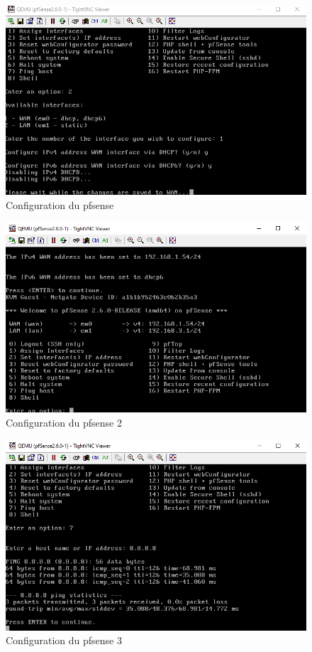 \begin{figure}[H]
 \centering
    \includegraphics[width=15cm]{Images/BRadesMelian-Topologie9.png}
    \caption{Configuration du pfsense}
    \label{Chap2.4.10}
\end{figure}    
\smallskip

\begin{figure}[H]
 \centering
    \includegraphics[width=15cm]{Images/BRadesMelian-Topologie10.png}
    \caption{Configuration du pfsense 2}
    \label{Chap2.4.11}
\end{figure}    
\smallskip

\begin{figure}[H]
 \centering
    \includegraphics[width=15cm]{Images/BRadesMelian-Topologie11.png}
    \caption{Configuration du pfsense 3}
    \label{Chap2.4.12}
\end{figure}    
\smallskip


